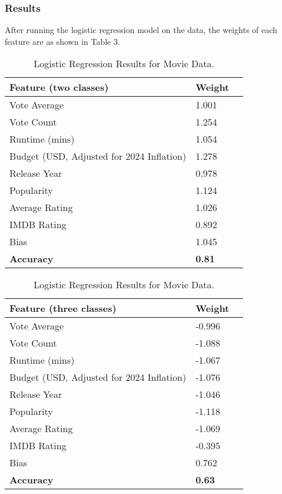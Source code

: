 \documentclass{article}
\begin{document}
\subsubsection{Results}
After running the logistic regression model on the data, the weights of each feature are as shown in Table 3.
\begin{table}[H]
    \centering
    \begin{tabular}{|l|l|l|}
        \hline
        \textbf{Feature (two classes)} & \textbf{Weight} \\ \hline
        Vote Average & 1.001 \\ \hline
        Vote Count & 1.254 \\ \hline
        Runtime (mins) & 1.054 \\ \hline
        Budget (USD, Adjusted for 2024 Inflation) & 1.278 \\ \hline
        Release Year & 0.978 \\ \hline
        Popularity & 1.124 \\ \hline
        Average Rating & 1.026 \\ \hline
        IMDB Rating & 0.892 \\ \hline
        Bias & 1.045 \\ \hline
        \hline
        \textbf{Accuracy} & \textbf{0.81} \\ \hline
    \end{tabular}

    \bigskip
    
    \begin{tabular}{|l|l|l|}
        \hline
        \textbf{Feature (three classes)} & \textbf{Weight} \\ \hline
        Vote Average & -0.996 \\ \hline
        Vote Count & -1.088 \\ \hline
        Runtime (mins) & -1.067 \\ \hline
        Budget (USD, Adjusted for 2024 Inflation) & -1.076 \\ \hline
        Release Year & -1.046 \\ \hline
        Popularity & -1.118 \\ \hline
        Average Rating & -1.069 \\ \hline
        IMDB Rating & -0.395 \\ \hline
        Bias & 0.762 \\ \hline
        \hline
        \textbf{Accuracy} & \textbf{0.63} \\ \hline
    \end{tabular}
    \caption{Logistic Regression Results for Movie Data.}
    \end{table}
\end{document}
